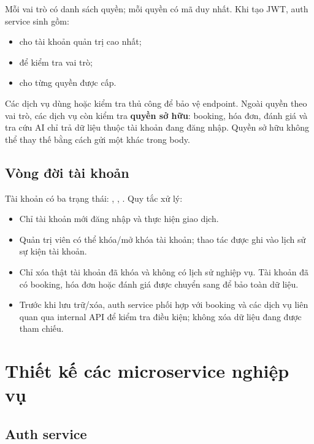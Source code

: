 Mỗi vai trò có danh sách quyền; mỗi quyền có mã duy nhất. Khi tạo JWT, auth service sinh  gồm:

\begin{itemize}
  \item {} cho tài khoản quản trị cao nhất;
  \item {} để kiểm tra vai trò;
  \item {} cho từng quyền được cấp.
\end{itemize}

Các dịch vụ dùng  hoặc kiểm tra thủ công để bảo vệ endpoint. Ngoài quyền theo vai trò, các dịch vụ còn kiểm tra \textbf{quyền sở hữu}: booking, hóa đơn, đánh giá và tra cứu AI chỉ trả dữ liệu thuộc tài khoản đang đăng nhập. Quyền sở hữu không thể thay thế bằng cách gửi một  khác trong body.

\subsection{Vòng đời tài khoản}

Tài khoản có ba trạng thái: , , . Quy tắc xử lý:

\begin{itemize}
  \item Chỉ tài khoản  mới đăng nhập và thực hiện giao dịch.
  \item Quản trị viên có thể khóa/mở khóa tài khoản; thao tác được ghi vào lịch sử sự kiện tài khoản.
  \item Chỉ xóa thật tài khoản đã khóa và không có lịch sử nghiệp vụ. Tài khoản đã có booking, hóa đơn hoặc đánh giá được chuyển sang  để bảo toàn dữ liệu.
  \item Trước khi lưu trữ/xóa, auth service phối hợp với booking và các dịch vụ liên quan qua internal API để kiểm tra điều kiện; không xóa dữ liệu đang được tham chiếu.
\end{itemize}

\section{Thiết kế các microservice nghiệp vụ}
\label{sec:thiet-ke-dich-vu}

\subsection{Auth service}
\label{subsec:auth-service}

